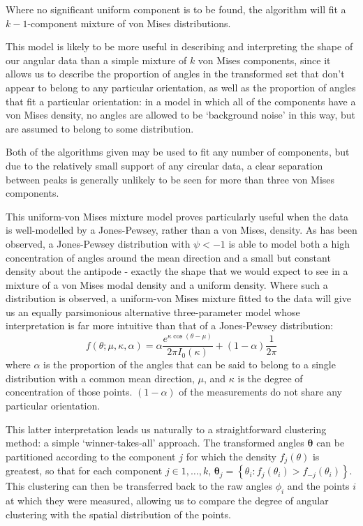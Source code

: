 \documentclass[../../ArchStats.tex]{subfiles}
\begin{document}
Where no significant uniform component is to be found, the algorithm will fit a $k-1$-component mixture of von Mises distributions.

This model is likely to be more useful in describing and interpreting the shape of our angular data than  a simple mixture of $k$ von Mises components, since it allows us to describe the proportion of angles in the transformed set that don't appear to belong to any particular orientation, as well as the proportion of angles that fit a particular orientation: in a model in which  all of the components have a von Mises density, no angles are allowed to be `background noise' in this way, but are assumed to belong to some distribution. 

Both of the algorithms given may be used to fit any number of components, but due to the relatively small support of any circular data, a clear separation between peaks is generally unlikely to be seen for more than three von Mises components. 

This uniform-von Mises mixture model proves particularly useful when the data is well-modelled by a Jones-Pewsey, rather than a von Mises, density. As has been observed, a Jones-Pewsey distribution with $\psi < -1$ is able to model both  a high concentration of angles around the mean direction and a small but constant density about the antipode - exactly the shape that we would expect to see in a mixture of a von Mises modal density and a uniform density.  Where such a distribution is observed, a uniform-von Mises mixture fitted to the data will give us an equally parsimonious alternative three-parameter model whose interpretation is far more intuitive than that of a Jones-Pewsey distribution:
\begin{equation}
f(\theta; \mu, \kappa, \alpha) = \alpha \frac{e^{\kappa \cos(\theta - \mu)}}{2\pi I_0(\kappa)} + (1-\alpha)\frac{1}{2\pi}
\end{equation}
where $\alpha$ is the proportion of the angles that can be said to belong to a single distribution with a common mean direction, $\mu$, and $\kappa$ is the degree of concentration of those points. $(1-\alpha)$ of the measurements do not share any particular orientation. 

This latter interpretation leads us naturally to a straightforward clustering method: a simple `winner-takes-all' approach. The transformed angles $\boldsymbol{\theta}$ can be partitioned according to the component $j$ for which the density $f_j(\theta)$ is greatest, so that for each component $j \in 1, \dots, k$, $\boldsymbol{\theta}_j = \left\lbrace \theta_i : f_j(\theta_i) > f_{-j}(\theta_i) \right\rbrace$. This clustering can then be transferred back to the raw angles $\phi_i$ and the points $i$ at which they were measured, allowing us to compare the degree of angular clustering with the spatial distribution of the points.

\end{document}

